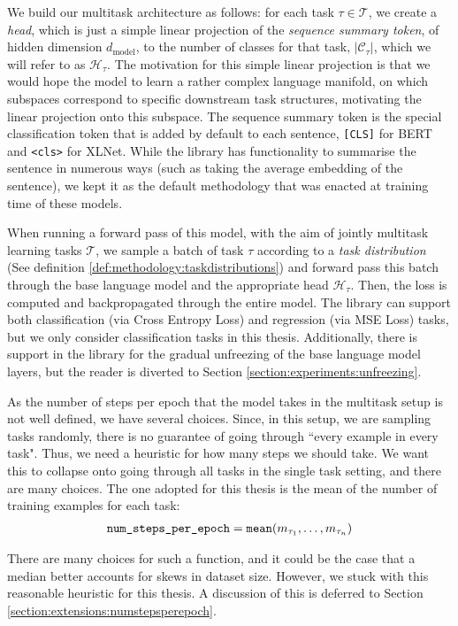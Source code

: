 We build our multitask architecture as follows: for each task $\tau \in \mathcal{T}$, we create a \textit{head}, which is just a simple linear projection of the \textit{sequence summary token}, of hidden dimension $d_\text{model}$, to the number of classes for that task, $|\mathcal{C}_\tau|$, which we will refer to as $\mathcal{H}_\tau$. The motivation for this simple linear projection is that we would hope the model to learn a rather complex language manifold, on which subspaces correspond to specific downstream task structures, motivating the linear projection onto this subspace. The sequence summary token is the special classification token that is added by default to each sentence, \texttt{[CLS]} for BERT and \texttt{<cls>} for XLNet. While the library has functionality to summarise the sentence in numerous ways (such as taking the average embedding of the sentence), we kept it as the default methodology that was enacted at training time of these models.

When running a forward pass of this model, with the aim of jointly multitask learning tasks $\mathcal{T}$, we sample a batch of task $\tau$ according to a \textit{task distribution} (See definition \ref{def:methodology:taskdistributions}) and forward pass this batch through the base language model and the appropriate head $\mathcal{H}_\tau$. Then, the loss is computed and backpropagated through the entire model. The library can support both classification (via Cross Entropy Loss) and regression (via MSE Loss) tasks, but we only consider classification tasks in this thesis. Additionally, there is support in the library for the gradual unfreezing of the base language model layers, but the reader is diverted to Section \ref{section:experiments:unfreezing}.

As the number of steps per epoch that the model takes in the multitask setup is not well defined, we have several choices. Since, in this setup, we are sampling tasks randomly, there is no guarantee of going through ``every example in every task". Thus, we need a heuristic for how many steps we should take. We want this to collapse onto going through all tasks in the single task setting, and there are many choices. The one adopted for this thesis is the mean of the number of training examples for each task:
\begin{align*}
\text{\texttt{num\_steps\_per\_epoch}} = \text{\texttt{mean}} (m_{\tau_1}, \dots, m_{\tau_n})
\end{align*} 

There are many choices for such a function, and it could be the case that a median better accounts for skews in dataset size. However, we stuck with this reasonable heuristic for this thesis. A discussion of this is deferred to Section \ref{section:extensions:numstepsperepoch}.

